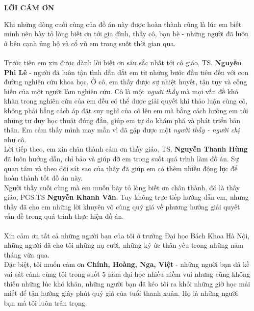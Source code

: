 \documentclass[12pt]{report}
\begin{document}
\pagestyle{fancy}
\fancyhf{}
\fancyhead[R]{\chaptermark}
\fancyfoot[R]{\thepage}
\renewcommand{\footrulewidth}{0.5pt}
\renewcommand{\headrulewidth}{0pt}

\makeatletter
\let\ps@plain\ps@fancy
\makeatother

\newpage
\begin{center}
\LARGE \textbf{LỜI CÁM ƠN}
\end{center}
Khi những dòng cuối cùng của đồ án này được hoàn thành cũng là lúc em biết mình nên bày tỏ lòng biết ơn tới gia đình, thầy cô, bạn bè - những người đã luôn ở bên cạnh ủng hộ và cổ vũ em trong suốt thời gian qua.\\ \\
Trước tiên em xin được dành lời biết ơn sâu sắc nhất tới cô giáo, TS. \textbf{Nguyễn Phi Lê} - người đã luôn tận tình dẫn dắt em từ những bước đầu tiên đến với con đường nghiên cứu khoa học. Ở cô, em thấy được sự nhiệt huyết, tận tụy và cống hiến của một người làm nghiên cứu. Cô là một \textit{người thầy} mà mọi vấn đề khó khăn trong nghiên cứu của em đều có thể được giải quyết khi thảo luận cùng cô, không phải bằng cách áp đặt suy nghĩ của cô lên em mà bằng cách hướng em tới những tư duy học thuật đúng đắn, giúp em tự do khám phá và phát triển bản thân. Em cảm thấy mình may mắn vì đã gặp được một \textit{người thầy - người chị} như cô.\\ 
Lời tiếp theo, em xin chân thành cảm ơn thầy giáo, TS. \textbf{Nguyễn Thanh Hùng} đã luôn hướng dẫn, chỉ bảo và giúp đỡ em trong suốt quá trình làm đồ án. Sự quan tâm và theo dõi sát sao của thầy đã giúp em có thêm nhiều động lực để hoàn thành tốt đồ án này.\\ 
Người thầy cuối cùng mà em muốn bày tỏ lòng biết ơn chân thành, đó là thầy giáo, PGS.TS \textbf{Nguyễn Khanh Văn}. Tuy không trực tiếp hướng dẫn em, nhưng thầy đã cho em những lời khuyên vô cùng quý giá về phương hướng giải quyết vấn đề trong quá trình thực hiện đồ án.\\ \\
Xin cảm ơn tất cả những người bạn của tôi ở trường Đại học Bách Khoa Hà Nội, những người đã cho tôi những nụ cười, những ký ức thân yêu trong những năm tháng vừa qua.\\
Đặc biệt, tôi muốn cảm ơn \textbf{Chính, Hoàng, Nga, Việt} - những người bạn đã kề vai sát cánh cùng tôi trong suốt 5 năm đại học nhiều niềm vui nhưng cũng không thiếu những lúc khó khăn, những người bạn đã kéo tôi ra khỏi những giờ học mải miết để tận hưởng giây phút quý giá của tuổi thanh xuân. Họ là những người bạn mà tôi luôn trân trọng.\\ \\
\end{document}
